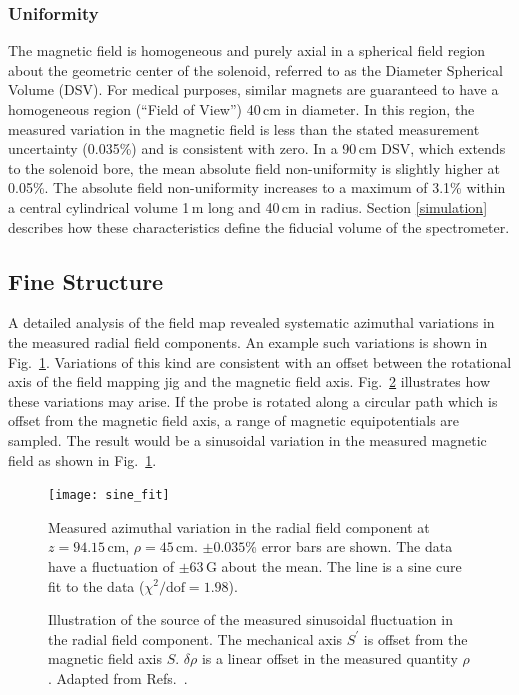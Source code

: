 \subsubsection{Uniformity}

The magnetic field is homogeneous and purely axial in a spherical field region about the geometric center of the solenoid, referred to as the Diameter Spherical Volume (DSV).  For medical purposes, similar magnets are guaranteed to have a homogeneous region (``Field of View'') 40\,cm in diameter.  
In this region, the measured variation in the magnetic field is less than the stated measurement uncertainty (0.035\%) and is consistent with zero.  In a 90\,cm DSV, which extends to the solenoid bore, the mean absolute field non-uniformity is slightly higher at 0.05\%.  
The absolute field non-uniformity increases to a maximum of 3.1\% within a central cylindrical volume 1\,m long and 40\,cm in radius.  Section \ref{simulation} describes how these characteristics define the fiducial volume of the spectrometer.

\subsection{Fine Structure}
A detailed analysis of the field map revealed systematic azimuthal variations in the measured radial field components.  An example such variations is shown in Fig.~\ref{sine_fit}.  Variations of this kind are consistent with an offset between the rotational axis of the field mapping jig and the magnetic field axis.  Fig.~\ref{map_off} illustrates how these variations may arise.  If the probe is rotated along a circular path which is offset from the magnetic field axis, a range of magnetic equipotentials are sampled.  The result would be a sinusoidal variation in the measured magnetic field as shown in Fig.~\ref{sine_fit}.

\begin{figure}%
\centering
\texttt{[image: sine\_fit]}%
\caption[Measured azimuthal variation in the radial field component at $z=94.15$\,cm, $\rho=45$\,cm]{Measured azimuthal variation in the radial field component at $z=94.15$\,cm, $\rho=45$\,cm.   $\pm 0.035$\% error bars are shown.  The data have a fluctuation of $\pm 63$\,G about the mean.  The line is a sine cure fit to the data ($\chi^2/\textrm{dof}=1.98$).}%
\label{sine_fit}%
\end{figure}

\begin{figure}%
\centering
{}
\caption[Illustration of the source of the measured sinusoidal fluctuation in the radial field component]{Illustration of the source of the measured sinusoidal fluctuation in the radial field component.  The mechanical axis $S^\prime$ is offset from the magnetic field axis $S$.  $\delta \rho$ is a linear offset in the measured quantity $\rho$.  Adapted from Refs.~\cite{Lighthall_2008SLM,Vann_2008}.}%
\label{map_off}%
\end{figure}


